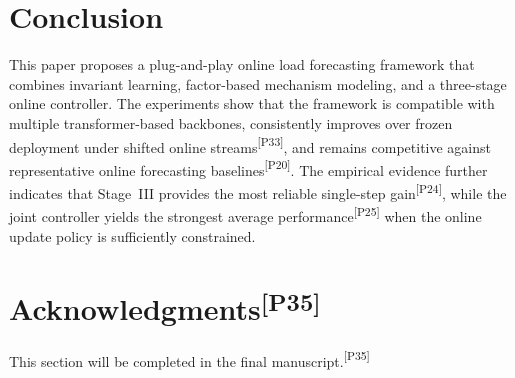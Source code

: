 ﻿\documentclass[journal]{IEEEtran}
\DeclareRobustCommand{\auditbad}[2]{{\color{auditred}#1}{\color{auditred}\textsuperscript{[#2]}}}
\begin{document}
\section{Conclusion}
This paper proposes a plug-and-play online load forecasting framework that combines invariant learning, factor-based mechanism modeling, and a three-stage online controller. The experiments show that the framework is compatible with multiple transformer-based backbones, \auditbad{consistently improves over frozen deployment under shifted online streams}{P33}, and remains competitive against \auditbad{representative online forecasting baselines}{P20}. The empirical evidence further indicates that Stage~III provides the \auditbad{most reliable single-step gain}{P24}, while the joint controller yields the \auditbad{strongest average performance}{P25} when the online update policy is sufficiently constrained.

\section*{\auditbad{Acknowledgments}{P35}}
\auditbad{This section will be completed in the final manuscript.}{P35}



\clearpage
\end{document}
